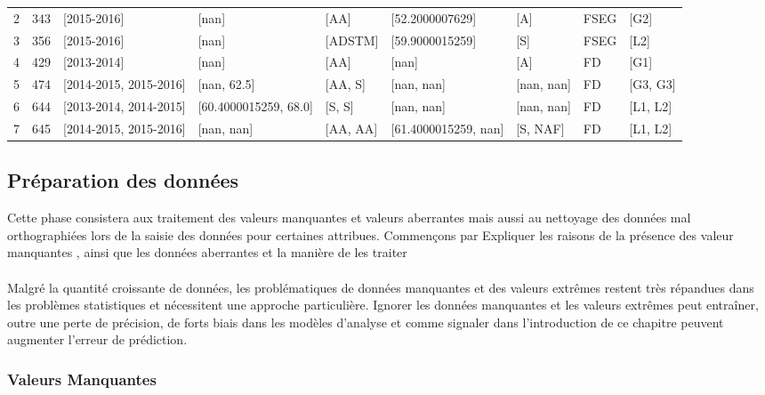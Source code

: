 \begin{table}
\begin{tabular}{lrlllllll}
	2 &  343 &             [2015-2016] &                  [nan] &      [AA] &       [52.2000007629] &         [A] &  FSEG &      [G2] \\
	3 &  356 &             [2015-2016] &                  [nan] &   [ADSTM] &       [59.9000015259] &         [S] &  FSEG &      [L2] \\
	4 &  429 &             [2013-2014] &                  [nan] &      [AA] &                 [nan] &         [A] &    FD &      [G1] \\
	5 &  474 &  [2014-2015, 2015-2016] &            [nan, 62.5] &   [AA, S] &            [nan, nan] &  [nan, nan] &    FD &  [G3, G3] \\
	6 &  644 &  [2013-2014, 2014-2015] &  [60.4000015259, 68.0] &    [S, S] &            [nan, nan] &  [nan, nan] &    FD &  [L1, L2] \\
	7 &  645 &  [2014-2015, 2015-2016] &             [nan, nan] &  [AA, AA] &  [61.4000015259, nan] &    [S, NAF] &    FD &  [L1, L2] \\
	\bottomrule
\end{tabular}
\endgroup
\end{table}
 \subsection{Préparation des données }
Cette phase consistera aux traitement des valeurs manquantes et valeurs aberrantes mais aussi au nettoyage des données mal orthographiées lors de la saisie des données pour certaines attribues. 
Commençons par  Expliquer les raisons de la présence des valeur manquantes , ainsi que les données aberrantes et la manière de les traiter
\paragraph{}
Malgré la quantité croissante de données, les problématiques de données
manquantes et des valeurs extrêmes restent très répandues dans les
problèmes statistiques et nécessitent une approche particulière. Ignorer
les données manquantes et les valeurs extrêmes peut entraîner, outre une
perte de précision, de forts biais dans les modèles d'analyse et comme
signaler dans l'introduction de ce chapitre peuvent augmenter l'erreur
de prédiction.
\subsubsection{Valeurs Manquantes}
